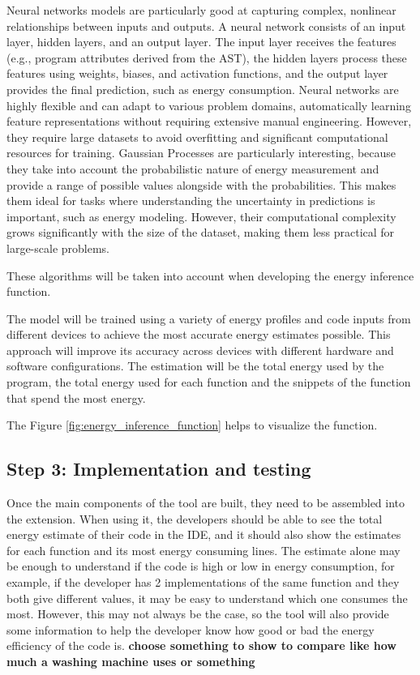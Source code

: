 \documentclass[sigplan]{acmart}
\begin{document}
Neural networks models are particularly good at capturing complex, nonlinear relationships between inputs and outputs. A neural network consists of an input layer, hidden layers, and an output layer. The input layer receives the features (e.g., program attributes derived from the AST), the hidden layers process these features using weights, biases, and activation functions, and the output layer provides the final prediction, such as energy consumption. Neural networks are highly flexible and can adapt to various problem domains, automatically learning feature representations without requiring extensive manual engineering. However, they require large datasets to avoid overfitting and significant computational resources for training.
Gaussian Processes are particularly interesting, because they take into account the probabilistic nature of energy measurement and provide a range of possible values alongside with the probabilities. This makes them ideal for tasks where understanding the uncertainty in predictions is important, such as energy modeling. However, their computational complexity grows significantly with the size of the dataset, making them less practical for large-scale problems.

These algorithms will be taken into account when developing the energy inference function.

The model will be trained using a variety of energy profiles and code inputs from different devices to achieve the most accurate energy estimates possible. This approach will improve its accuracy across devices with different hardware and software configurations.
The estimation will be the total energy used by the program, the total energy used for each function and the snippets of the function that spend the most energy.

The Figure \ref{fig:energy_inference_function} helps to visualize the function.

\subsection{Step 3: Implementation and testing} \label{sec:work_step3_implementation_and_testing}

Once the main components of the tool are built, they need to be assembled into the extension. When using it, the developers should be able to see the total energy estimate of their code in the IDE, and it should also show the estimates for each function and its most energy consuming lines.
The estimate alone may be enough to understand if the code is high or low in energy consumption, for example, if the developer has 2 implementations of the same function and they both give different values, it may be easy to understand which one consumes the most. However, this may not always be the case, so the tool will also provide some information to help the developer know how good or bad the energy efficiency of the code is. \textbf{choose something to show to compare like how much a washing machine uses or something}
\end{document}

